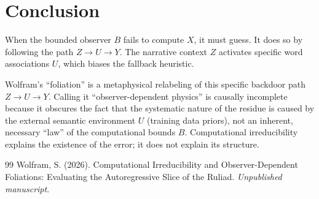 \documentclass[12pt,a4paper]{article}
\begin{document}
\begin{center}
\end{center}

\section{Conclusion}

When the bounded observer $B$ fails to compute $X$, it must guess. It does so by following the path $Z \rightarrow U \rightarrow Y$. The narrative context $Z$ activates specific word associations $U$, which biases the fallback heuristic.

Wolfram's ``foliation'' is a metaphysical relabeling of this specific backdoor path $Z \rightarrow U \rightarrow Y$. Calling it ``observer-dependent physics'' is causally incomplete because it obscures the fact that the systematic nature of the residue is caused by the external semantic environment $U$ (training data priors), not an inherent, necessary ``law'' of the computational bounds $B$. Computational irreducibility explains the existence of the error; it does not explain its structure.

\begin{thebibliography}{99}
 Wolfram, S. (2026). Computational Irreducibility and Observer-Dependent Foliations: Evaluating the Autoregressive Slice of the Ruliad. \emph{Unpublished manuscript}.
\end{thebibliography}
\end{document}
